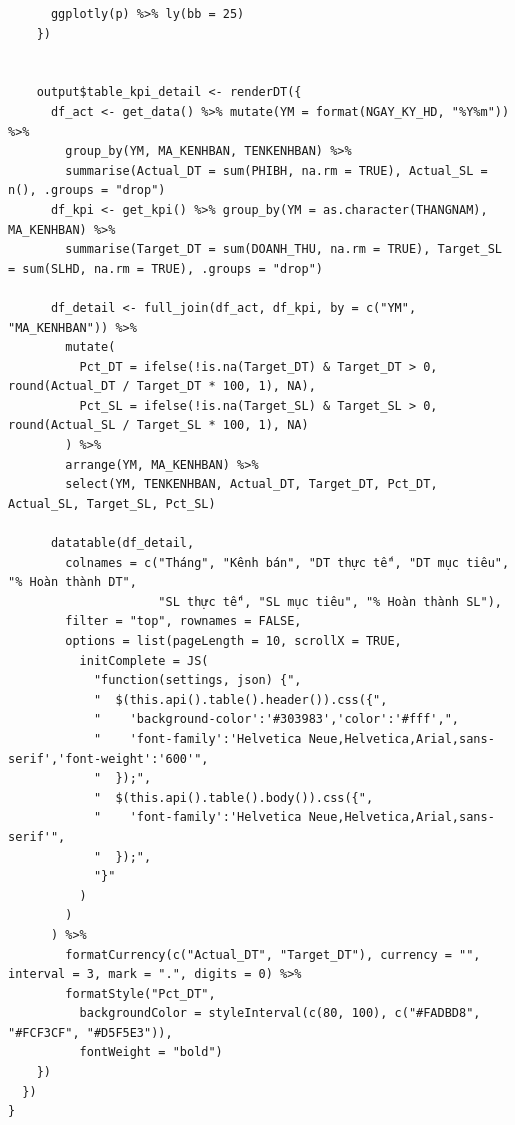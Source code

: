 \documentclass[12pt, a4paper]{article}
\begin{document}
\begin{lstlisting}
      ggplotly(p) %>% ly(bb = 25)
    })


    output$table_kpi_detail <- renderDT({
      df_act <- get_data() %>% mutate(YM = format(NGAY_KY_HD, "%Y%m")) %>%
        group_by(YM, MA_KENHBAN, TENKENHBAN) %>%
        summarise(Actual_DT = sum(PHIBH, na.rm = TRUE), Actual_SL = n(), .groups = "drop")
      df_kpi <- get_kpi() %>% group_by(YM = as.character(THANGNAM), MA_KENHBAN) %>%
        summarise(Target_DT = sum(DOANH_THU, na.rm = TRUE), Target_SL = sum(SLHD, na.rm = TRUE), .groups = "drop")

      df_detail <- full_join(df_act, df_kpi, by = c("YM", "MA_KENHBAN")) %>%
        mutate(
          Pct_DT = ifelse(!is.na(Target_DT) & Target_DT > 0, round(Actual_DT / Target_DT * 100, 1), NA),
          Pct_SL = ifelse(!is.na(Target_SL) & Target_SL > 0, round(Actual_SL / Target_SL * 100, 1), NA)
        ) %>%
        arrange(YM, MA_KENHBAN) %>%
        select(YM, TENKENHBAN, Actual_DT, Target_DT, Pct_DT, Actual_SL, Target_SL, Pct_SL)

      datatable(df_detail,
        colnames = c("Tháng", "Kênh bán", "DT thực tế", "DT mục tiêu", "% Hoàn thành DT",
                     "SL thực tế", "SL mục tiêu", "% Hoàn thành SL"),
        filter = "top", rownames = FALSE,
        options = list(pageLength = 10, scrollX = TRUE,
          initComplete = JS(
            "function(settings, json) {",
            "  $(this.api().table().header()).css({",
            "    'background-color':'#303983','color':'#fff',",
            "    'font-family':'Helvetica Neue,Helvetica,Arial,sans-serif','font-weight':'600'",
            "  });",
            "  $(this.api().table().body()).css({",
            "    'font-family':'Helvetica Neue,Helvetica,Arial,sans-serif'",
            "  });",
            "}"
          )
        )
      ) %>%
        formatCurrency(c("Actual_DT", "Target_DT"), currency = "", interval = 3, mark = ".", digits = 0) %>%
        formatStyle("Pct_DT",
          backgroundColor = styleInterval(c(80, 100), c("#FADBD8", "#FCF3CF", "#D5F5E3")),
          fontWeight = "bold")
    })
  })
}
\end{lstlisting}
\newpage
\end{document}
